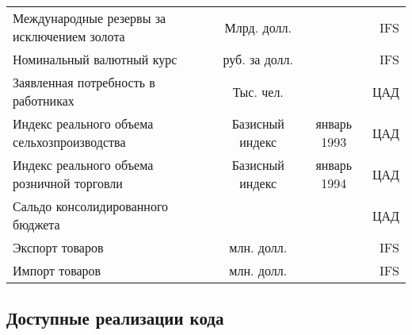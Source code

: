 \documentclass[11pt]{article} %
\begin{document}
\begin{landscape}
\begin{center}
\begin{table}[h!]
\begin{tabular}{lccr}
Международные резервы за исключением золота & Млрд. долл. &  & IFS \\
Номинальный валютный курс & руб. за долл. &  & IFS \\
Заявленная потребность в работниках & Тыс. чел. &  & ЦАД \\
Индекс реального объема сельхозпроизводства & Базисный индекс & январь 1993 & ЦАД\\
Индекс реального объема розничной торговли & Базисный индекс & январь 1994 & ЦАД\\
Сальдо консолидированного бюджета &  &  & ЦАД \\
Экспорт товаров & млн. долл. &  & IFS \\
Импорт товаров & млн. долл. &  & IFS \\
\end{tabular}
\end{table}
\end{center}
\end{landscape}
\newpage
\subsection*{Доступные реализации кода}
\end{document}
